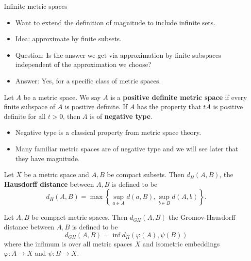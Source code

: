 \documentclass[12pt,mathserif]{beamer}
\begin{document}
\begin{frame}[allowframebreaks]{Infinite metric spaces}
\begin{itemize}
\item Want to extend the definition of magnitude to include infinite sets.
\item Idea: approximate by finite subsets.
\item Question: Is the answer we get via approximation by finite subspaces independent of the approximation we choose?
\item Answer: Yes, for a specific class of metric spaces.
\end{itemize}

\framebreak

\begin{definition}
Let $A$ be a metric space. We say $A$ is a \textbf{positive definite metric space} if every finite subspace of $A$ is positive definite. If $A$ has the property that $tA$ is positive definite for all $t > 0$, then $A$ is of \textbf{negative type}.
\end{definition}

\begin{itemize}
\item Negative type is a classical property from metric space theory.
\item Many familiar metric spaces are of negative type and we will see later that they have magnitude.
\end{itemize}

\framebreak

\begin{definition}
Let $X$ be a metric space and $A,B$ be compact subsets. Then $d_H(A,B)$, the \textbf{Hausdorff distance} between $A,B$ is defined to be
\begin{equation*}
d_H(A,B) = \max\left\{\sup\limits_{a \in A} d(a,B), \sup\limits_{b \in B} d(A,b)\right\}.
\end{equation*}
\end{definition}

\framebreak

\begin{definition}
Let $A,B$ be compact metric spaces. Then $d_{GH}(A,B)$ the Gromov-Hausdorff distance between $A,B$ is defined to be
\begin{equation*}
d_{GH}(A,B) = \inf d_H(\varphi(A),\psi(B))
\end{equation*}
where the infimum is over all metric spaces $X$ and isometric embeddings $\varphi: A \to X$ and $\psi: B \to X$.
\end{definition}


\end{frame}
\end{document}
